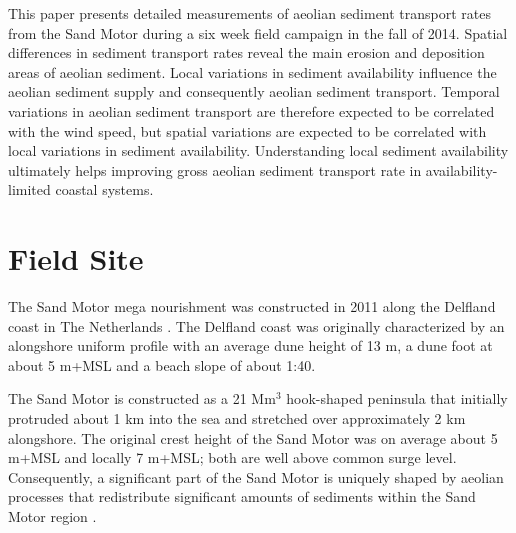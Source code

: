 This paper presents detailed measurements of aeolian sediment
transport rates from the Sand Motor during a six week field campaign
in the fall of 2014. Spatial differences in sediment transport rates
reveal the main erosion and deposition areas of aeolian
sediment. Local variations in sediment availability influence the
aeolian sediment supply and consequently aeolian sediment
transport. Temporal variations in aeolian sediment transport are
therefore expected to be correlated with the wind speed, but spatial
variations are expected to be correlated with local variations in
sediment availability. Understanding local sediment availability
ultimately helps improving gross aeolian sediment transport rate in
availability-limited coastal systems.

\section{Field Site}
\label{sec:fieldsite2}

The Sand Motor mega nourishment was constructed in 2011 along the
Delfland coast in The Netherlands \citep[Figure
\ref{fig:fieldsite2},][]{Stive2013}.  The Delfland coast was originally
characterized by an alongshore uniform profile with an average dune
height of 13 m, a dune foot at about 5 m+MSL and a beach slope of
about 1:40.

The Sand Motor is constructed as a 21 $\mathrm{Mm^3}$ hook-shaped
peninsula that initially protruded about 1 km into the sea and
stretched over approximately 2 km alongshore. The original crest
height of the Sand Motor was on average about 5 m+MSL and locally 7
m+MSL; both are well above common surge level. Consequently, a
significant part of the Sand Motor is uniquely shaped by aeolian
processes that redistribute significant amounts of sediments within
the Sand Motor region \citep{Hoonhout2017a}.

